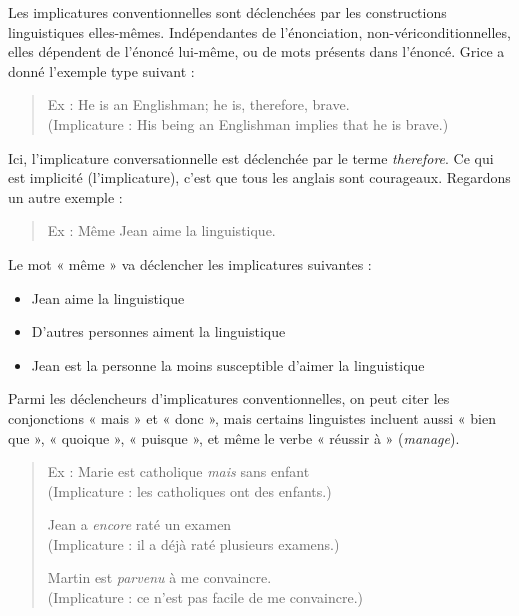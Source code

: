 Les implicatures conventionnelles sont déclenchées par les constructions linguistiques elles-mêmes. Indépendantes de l’énonciation, non-vériconditionnelles, elles dépendent de l’énoncé lui-même, ou de mots présents dans l’énoncé. Grice a donné l’exemple type suivant :
\begin{quote}
Ex : He is an Englishman; he is, therefore, brave.\\
(Implicature : His being an Englishman implies that he is brave.)
\end{quote}
Ici, l’implicature conversationnelle est déclenchée par le terme \textit{therefore}. Ce qui est implicité (l’implicature), c’est que tous les anglais sont courageaux.
Regardons un autre exemple :
\begin{quote}Ex : Même Jean aime la linguistique.\end{quote}

Le mot « même » va déclencher les implicatures suivantes :
\begin{itemize}
\item Jean aime la linguistique
\item D’autres personnes aiment la linguistique
\item Jean est la personne la moins susceptible d’aimer la linguistique
\end{itemize}
Parmi les déclencheurs d’implicatures conventionnelles, on peut citer les conjonctions « mais » et « donc », mais certains linguistes incluent aussi « bien que », « quoique », « puisque », et même le verbe « réussir à » (\textit{manage}).
\begin{quote}
Ex : Marie est catholique \textit{mais} sans enfant\\
(Implicature : les catholiques ont des enfants.)

Jean a \textit{encore} raté un examen\\
(Implicature : il a déjà raté plusieurs examens.)

Martin est \textit{parvenu} à me convaincre.\\
(Implicature : ce n’est pas facile de me convaincre.)
\end{quote}

